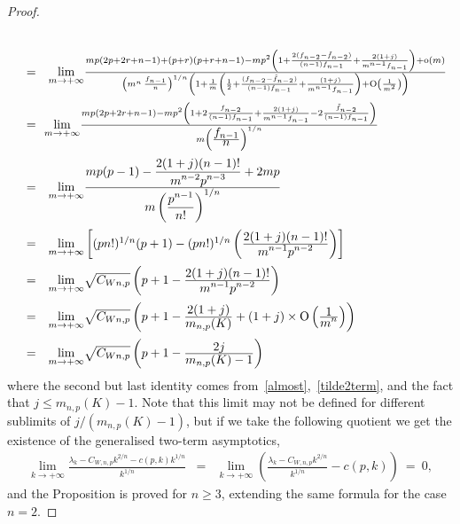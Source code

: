 \documentclass[11pt,a4paper,times]{amsart}
\theoremstyle{plain}
\theoremstyle{definition}
\numberwithin{equation}{section}
\newcommand{\bo}{{\rm O}}
\newcommand{\ds}{\displaystyle}
\newcommand{\eqskip}{ \vspace*{2mm}\\ }
\newcommand{\so}{{\rm o}}
\newcommand{\fr}[2]{\frac{\ds #1}{\ds #2}}
\begin{document}
{\begin{proof}
\begin{gather*}
\begin{array}{lll}
{{}}\nonumber\eqskip
&=& {\ds\lim_{m\to +\infty}}\frac{ mp(2p+2r+n-1)+(p+r)(p+r+n-1)-{mp^2}\left(1
+\frac{2(f_{n-2}-\tilde{f}_{n-2})}{(n-1)f_{n-1}} +
\frac{2(1+j)}{m^{n-1}f_{n-1}}\right)+\so(m)}{
\left(m^n\,\frac{f_{n-1}}{n}\right)^{1/n}\left( 1 +\frac{1}{m}\left(\frac{1}{2}
+\frac{(f_{n-2}-\tilde{f}_{n-2})}{(n-1)f_{n-1}} +\frac{(1+j)}{m^{n-1}f_{n-1}}\right)+\bo\left(\frac{1}{m^2}\right)\right)
}\nonumber\eqskip
&=&\!\! {\ds\lim_{m\to +\infty}}
 \frac{mp(2p+2r+n-1)-{mp^2}
\left(1+2\frac{f_{n-2}}{(n-1)f_{n-1}} +
\frac{2(1+j)}{m^{n-1}f_{n-1}}
-2\frac{\tilde{f}_{n-2}}{(n-1)f_{n-1}}\right)
}
{m\left(\fr{f_{n-1}}{n}\right)^{1/n}}\eqskip
&=& {\ds\lim_{m\to +\infty}} \fr{mp(p-1)-\fr{2(1+j)(n-1)!}{m^{n-2}p^{n-3}}+2mp}{m\left(\fr{p^{n-1}}{n!}\right)^{1/n}}\eqskip
&=& {\ds\lim_{m\to +\infty}} \left[
(pn!)^{1/n}(p+1)-(pn!)^{1/n}\left(\fr{2(1+j)(n-1)!}{m^{n-1}p^{n-2}}\right)\right]\eqskip
&=&  {\ds\lim_{m\to +\infty}}
\sqrt{C_{W n,p}}\left( p+1-\fr{2(1+j)(n-1)!}{m^{n-1}p^{n-2}}\right)\eqskip
&=& {\ds\lim_{m\to +\infty}}
\sqrt{C_{W n,p}}\left( p+1-\fr{2(1+j)}{m_{n,p}(K)}+(1+ j)\times \bo\left(\fr{1}{m^n}\right)\right)  \eqskip
&=& {\ds\lim_{m \to +\infty}}
\sqrt{C_{W n,p}}\left( p+1-\fr{2j}{m_{n,p}(K)-1}\right)
\end{array}
\end{gather*}
where the second but last identity comes from~\eqref{almost},~\eqref{tilde2term}, and the fact that
 $j\leq m_{n,p}(K)-1$.
 Note that this limit may not be defined for different sublimits of $j/(m_{n,p}(K)-1)$, but if we take the following quotient we get the existence of the generalised two-term asymptotics,
\begin{eqnarray*}
\lim_{k\to +\infty}\frac{\lambda_k-C_{W,n,p}k^{2/n}- c(p,k)k^{1/n}}{k^{1/n}} &=&\lim_{k\to +\infty}\left(\frac{\lambda_k-C_{W,n,p}k^{2/n}}{k^{1/n}}- c(p,k)\right)~
 =~0,
\end{eqnarray*}
and the Proposition is proved for $n\geq 3$, extending the  same formula for the case $n=2$. 
\end{proof}



}
\end{document}
